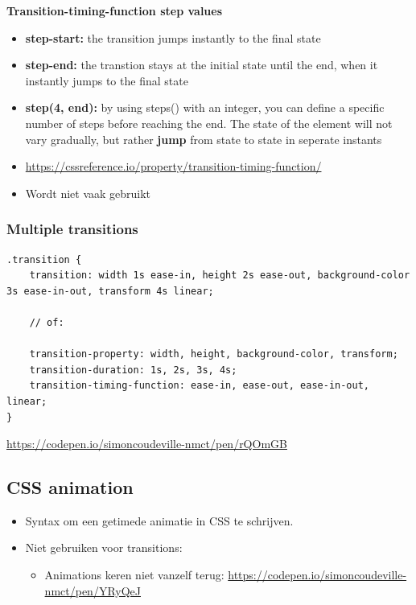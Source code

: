 \documentclass{article}
\newcommand{\bold}[1]{\textbf{#1}}
\begin{document}
\bold{Transition-timing-function step values}

\begin{itemize}
    \item \bold{step-start:} the transition jumps instantly to the final state
    \item \bold{step-end:} the transtion stays at the initial state until the end, when it instantly jumps to the final state
    \item \bold{step(4, end):} by using steps() with an integer, you can define a specific number of steps before reaching the end.
    The state of the element will not vary gradually, but rather \bold{jump} from state to state in seperate instants
    \item \url{https://cssreference.io/property/transition-timing-function/}
    \item Wordt niet vaak gebruikt
\end{itemize}

\subsubsection{Multiple transitions}
\begin{verbatim}
.transition {
    transition: width 1s ease-in, height 2s ease-out, background-color 3s ease-in-out, transform 4s linear;

    // of:

    transition-property: width, height, background-color, transform;
    transition-duration: 1s, 2s, 3s, 4s;
    transition-timing-function: ease-in, ease-out, ease-in-out, linear;
}
\end{verbatim}

\url{https://codepen.io/simoncoudeville-nmct/pen/rQOmGB}

\subsection{CSS animation}
\begin{itemize}
    \item Syntax om een getimede animatie in CSS te schrijven.
    \item Niet gebruiken voor transitions:
    \begin{itemize}
        \item Animations keren niet vanzelf terug: \url{https://codepen.io/simoncoudeville-nmct/pen/YRyQeJ}
    \end{itemize}
\end{itemize}
\end{document}
